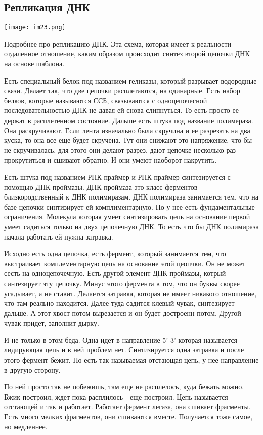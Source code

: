 \subsection{Репликация ДНК}
\texttt{[image: im23.png]}

Подробнее про репликацию ДНК. Эта схема, которая имеет к реальности 
отдаленное отношение, каким образом происходит синтез второй цепочки ДНК на 
основе шаблона. 

Есть специальный белок под названием геликазы, который разрывает водородные связи. 
Делает так, что две цепочки расплетаются, на одинарные. Есть набор 
белков, которые называются ССБ, связываются с одноцепочесной последовательностью ДНК
не давая ей снова слипнуться. То есть просто ее держат в расплетенном состояние. 
Дальше есть штука под название полимераза.  Она раскручивают. Если лента изначально была 
скручина и ее разрезать на два куска, то она все еще будет скручена. Тут они снижают это 
напряжение, что бы не скручивалась, для этого они делают разрез, дают 
цепочке несколько раз прокрутиться и сшивают обратно. И они 
умеют наоборот накрутить. 

Есть штука под названием РНК праймер и РНК праймер синтезируется с помощью
ДНК проймазы. ДНК проймаза это класс ферментов близкородственный к ДНК 
полимиразам. ДНК полимираза занимается тем, что на базе 
цепочки синтизирует ей комплиментарную. Но у нее есть фундаментальные ограничения. 
Молекула которая умеет синтизировать цепь на основание первой умеет садиться 
только на двух цепочечную ДНК. То есть что бы ДНК полимираза начала работать 
ей нужна затравка. 

Исходно есть одна цепочка, есть фермент, который занимается тем, что выстраивает 
комплементарную цепь на основание этой цеопчки. Он не может 
сесть на одноцепочечную. Есть другой элемент ДНК проймазы, котрый 
синтезирует эту цепочку. Минус этого 
фермента в том, что он буквы скорее угадывает, а не ставит. Делается 
затравка, которая не имеет никакого отношение, что там реально находится. 
Далее туда садится клевый чувак, синтезирует дальше. А этот хвост потом вырезается и он 
будет достроенн потом. Другой чувак придет, заполнит дырку. 

И не только в этом беда. Одна идет в направление 5' 3' которая называется лидирующая цепь и 
в ней проблем нет. Синтизируется одна затравка и после этого 
фермент бежит. Но есть так называемая отстающая цепь, у нее направление в другую сторону. 

По ней просто так не побежишь, там еще не расплелось, куда бежать можно. Бжик построил, 
ждет пока расплилось - еще построил. Цепь называется отстающей и так и работает. 
Работает фермент легаза, она сшивает фрагменты. Есть много мелких фрагментов, они 
сшиваются вместе. Получается тоже самое, но медленнее. 

